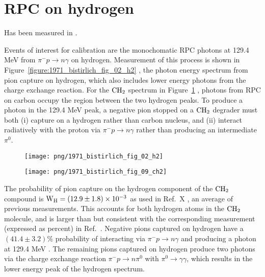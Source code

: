 
\section{RPC on hydrogen}

Has been measured in \cite{RPC_1972_Bistirlich_PhysRevC.5.1867}.

Events of interest for calibration are the monochomatic RPC photons at 129.4 MeV from $\pi^{-} p \to n \gamma$ on
hydrogen. Measurement of this process is shown in 
Figure~\ref{figure:1971_bistirlich_fig_02_h2}
, the photon energy spectrum from pion capture on hydrogen, which also includes lower energy photons from the charge exchange reaction. 
For the $\rm{CH_2}$ spectrum in 
Figure~\ref{figure:1971_bistirlich_fig_09_ch2}
, photons from RPC on carbon occupy the region between the two hydrogen peaks.
To produce a photon in the 129.4 MeV peak, a negative pion stopped on
a $\rm{CH_2}$  degrader must both (i) capture on a hydrogen rather than carbon nucleus, and (ii) interact
radiatively with the proton via $\pi^{-} p \to n \gamma$ rather than producing an intermediate $\pi^0$.


\begin{figure}[H]
 \begin{minipage}{.5\textwidth}
  \texttt{[image: png/1971\_bistirlich\_fig\_02\_h2]}
  \captionsetup{width=.8\linewidth}
  \caption[width=0.9\textwidth]{
      \label{figure:1971_bistirlich_fig_02_h2}
    }
 \end{minipage}
 \begin{minipage}{.5\textwidth}
  \texttt{[image: png/1971\_bistirlich\_fig\_09\_ch2]}
  \captionsetup{width=.8\linewidth}
  \caption[width=0.9\textwidth]{
  \label{figure:1971_bistirlich_fig_09_ch2}
   }
 \end{minipage}
\end{figure}

The probability of pion capture on the hydrogen component of the $\rm{CH_2}$ compound is
$\rm{ W_H = (12.9 \pm 1.8) \times 10^{-3 }}$
 as used in Ref.~X 
 , an average of previous measurements. 
 This accounts for both hydrogen atoms in the $\rm{CH_2}$ molecule, and is larger than but consistent with the
 corresponding measurement (expressed as percent) in Ref.~\cite{RPC_1972_Bistirlich_PhysRevC.5.1867}.
 Negative pions captured on hydrogen have a $ (41.4 \pm 3.2) \% $
 probability of interacting via $\pi^{-} p \to n \gamma$ and producing a photon at 129.4 MeV
 \cite{RPC_1972_Bistirlich_PhysRevC.5.1867}.
 The remaining pions captured on hydrogen produce two photons via the charge exchange reaction
 $ \pi^{-} p \to n \pi^0 $ with $\pi^0  \to \gamma \gamma $,
 which results in the lower energy peak of the hydrogen spectrum. 

